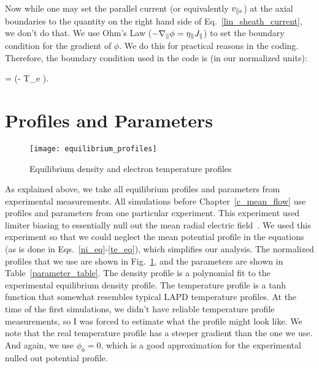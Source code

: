 Now while one may set the parallel current (or equivalently $v_{\parallel e}$) at the axial boundaries to the quantity on the right hand side of Eq.~\ref{lin_sheath_current}, we don't do that.
We use Ohm's Law ($- \nabla_\parallel \phi = \eta_\parallel J_\parallel$) to set the boundary condition for the gradient of $\phi$. We do this for practical reasons in the coding. Therefore, the
boundary condition used in the code is (in our normalized units):

\beq
\label{sheath_bc}
\gradpar \phi = \pm {} \left(\phi - \Lambda T_e  \right).
\eeq



\section{Profiles and Parameters}
\label{s_profs_params}

\begin{figure}[!ht]
\texttt{[image: equilibrium\_profiles]}
\centering
\caption{Equilibrium density and electron temperature profiles}
\label{equilibrium_profiles}
\end{figure}


As explained above, we take all equilibrium profiles and parameters from experimental measurements. 
All simulations before Chapter~\ref{c_mean_flow} use profiles and parameters from one particular experiment.
This experiment used limiter biasing to essentially null out the mean radial electric field~\cite{schaffner2012}. We used this experiment so that we could neglect the mean potential profile
in the equations (as is done in Eqs.~\ref{ni_eq}-\ref{te_eq}), which simplifies our analysis. The normalized profiles that we use are shown in Fig.~\ref{equilibrium_profiles}, and the parameters
are shown in Table~\ref{parameter_table}. The density profile is
a polynomial fit to the experimental equilibrium density profile. The temperature profile is a tanh function that somewhat resembles typical LAPD temperature profiles. At the time of the first
simulations, we didn't have reliable temperature profile measurements, so I was forced to estimate what the profile might look like. We note that the real temperature profile has a steeper
gradient than the one we use. And again, we use $\phi_0 = 0$, which is a good approximation for the experimental nulled out potential profile.

